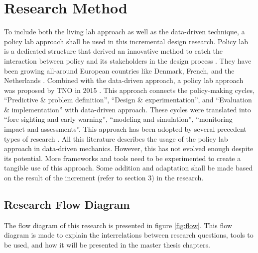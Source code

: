 \section{Research Method}
To include both the living lab approach as well as the data-driven technique, a policy lab approach shall be used in this incremental design research. Policy lab is a dedicated structure that derived an innovative method to catch the interaction between policy and its stakeholders in the design process \citep{Fuller2016PublicStates}.  They have been growing all-around European countries like Denmark, French, and the Netherlands \citep{Fuller2016PublicStates,Williamson2015GoverningEducation}. Combined with the data-driven approach, a policy lab approach was proposed by TNO in 2015 \citep{vanVeenstra2017Data-drivenApproach}. 
This approach connects the policy-making cycles, “Predictive \& problem definition”, “Design \& experimentation”, and “Evaluation \& implementation” \citep{Lasswell1951TheOrientation}  with data-driven approach. These cycles were translated into “fore sighting and early warning”, “modeling and simulation”, “monitoring impact and assessments”\citep{vanVeenstra2017Data-drivenApproach}. 
This approach has been adopted by several precedent types of research \citep{Diran2019Data-drivenApproach, Federico2019DesignInnovation, Ibrahim2020UnderstandingAnalytics, Kruyen2018TowardsApproach, Radermacher2019Governing-by-the-numbers/statisticalSociety}. All this literature describes the usage of the policy lab approach in data-driven mechanics. However, this has not evolved enough despite its potential. More frameworks and tools need to be experimented to create a tangible use of this approach. Some addition and adaptation shall be made based on the result of the increment (refer to section 3) in the research.

\subsection{Research Flow Diagram}
The flow diagram of this research is presented in figure \ref{fig:flow}. This flow diagram is made to explain the interrelations between research questions, tools to be used, and how it will be presented in the master thesis chapters.

